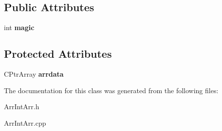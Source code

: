 \subsection*{Public Attributes}
\begin{DoxyCompactItemize}
\item 
\hypertarget{class_c_arr_int_arr_ab67e62550742cbfeb49d168c34fceb50}{int {\bfseries magic}}\label{class_c_arr_int_arr_ab67e62550742cbfeb49d168c34fceb50}

\end{DoxyCompactItemize}
\subsection*{Protected Attributes}
\begin{DoxyCompactItemize}
\item 
\hypertarget{class_c_arr_int_arr_afe7437771adf1aef5dfa9c3febe3c99c}{C\-Ptr\-Array {\bfseries arrdata}}\label{class_c_arr_int_arr_afe7437771adf1aef5dfa9c3febe3c99c}

\end{DoxyCompactItemize}


The documentation for this class was generated from the following files\-:\begin{DoxyCompactItemize}
\item 
Arr\-Int\-Arr.\-h\item 
Arr\-Int\-Arr.\-cpp\end{DoxyCompactItemize}
